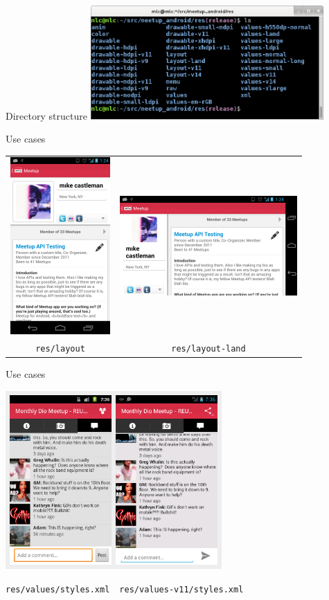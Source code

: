 \documentclass{beamer}
\begin{document}
\begin{frame}{Directory structure}
\includegraphics[width=3.5in]{dir.png}
\end{frame}

\begin{frame}{Use cases}
\begin{tabular}{cc}
\includegraphics[width=1.5in]{layout.png} &
\includegraphics[height=1.5in]{layout-land.png} \\
\texttt{res/layout} & \texttt{res/layout-land}
\end{tabular}
\end{frame}

\begin{frame}{Use cases}
\centerline{\includegraphics[width=3.25in]{api-levels.png}}

\centerline{\texttt{res/values/styles.xml}\ \ \texttt{res/values-v11/styles.xml}}
\end{frame}
\end{document}
